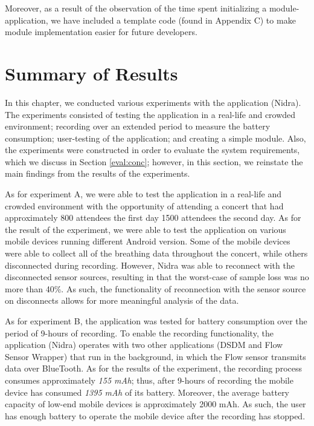 Moreover, as a result of the observation of the time spent initializing a module-application, we have included a template code (found in Appendix C) to make module implementation easier for future developers. 




\section{Summary of Results}

In this chapter, we conducted various experiments with the application (Nidra). The experiments consisted of testing the application in a real-life and crowded environment; recording over an extended period to measure the battery consumption; user-testing of the application; and creating a simple module. Also, the experiments were constructed in order to evaluate the system requirements, which we discuss in Section \ref{eval:conc}; however, in this section, we reinstate the main findings from the results of the experiments.

As for experiment A, we were able to test the application in a real-life and crowded environment with the opportunity of attending a concert that had approximately 800 attendees the first day 1500 attendees the second day. As for the result of the experiment, we were able to test the application on various mobile devices running different Android version. Some of the mobile devices were able to collect all of the breathing data throughout the concert, while others disconnected during recording. However, Nidra was able to reconnect with the disconnected sensor sources, resulting in that the worst-case of sample loss was no more than 40\%. As such, the functionality of reconnection with the sensor source on disconnects allows for more meaningful analysis of the data.

As for experiment B, the application was tested for battery consumption over the period of 9-hours of recording. To enable the recording functionality, the application (Nidra) operates with two other applications (DSDM and Flow Sensor Wrapper) that run in the background, in which the Flow sensor transmits data over BlueTooth. As for the results of the experiment, the recording process consumes approximately \textit{155 mAh}; thus, after 9-hours of recording the mobile device has consumed \textit{1395 mAh} of its battery. Moreover, the average battery capacity of low-end mobile devices is approximately 2000 mAh. As such, the user has enough battery to operate the mobile device after the recording has stopped. 

